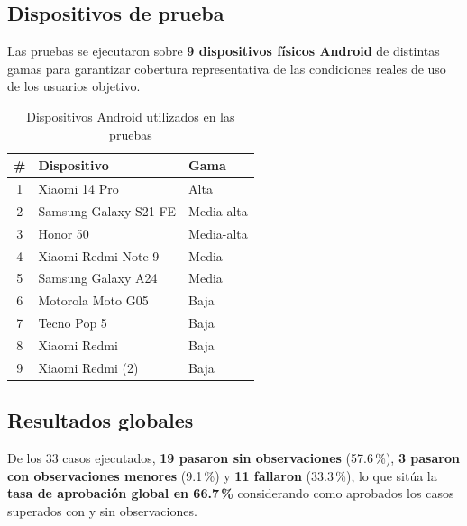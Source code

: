 \subsection{Dispositivos de prueba}

Las pruebas se ejecutaron sobre \textbf{9 dispositivos físicos Android} de distintas gamas para garantizar cobertura representativa de las condiciones reales de uso de los usuarios objetivo.

\begin{table}[H]
  \centering
  \small
  \caption{Dispositivos Android utilizados en las pruebas}
  \label{tab:dispositivos-prueba}
  \begin{tabular}{c l l}
    \toprule
    \textbf{\#} & \textbf{Dispositivo}         & \textbf{Gama}      \\
    \midrule
    1           & Xiaomi 14 Pro                & Alta               \\
    2           & Samsung Galaxy S21 FE        & Media-alta         \\
    3           & Honor 50                     & Media-alta         \\
    4           & Xiaomi Redmi Note 9          & Media              \\
    5           & Samsung Galaxy A24           & Media              \\
    6           & Motorola Moto G05            & Baja               \\
    7           & Tecno Pop 5                  & Baja               \\
    8           & Xiaomi Redmi                 & Baja               \\
    9           & Xiaomi Redmi (2)             & Baja               \\
    \bottomrule
  \end{tabular}
\end{table}

\subsection{Resultados globales}

De los 33 casos ejecutados, \textbf{19 pasaron sin observaciones} (57.6\,\%), \textbf{3 pasaron con observaciones menores} (9.1\,\%) y \textbf{11 fallaron} (33.3\,\%), lo que sitúa la \textbf{tasa de aprobación global en 66.7\,\%} considerando como aprobados los casos superados con y sin observaciones.


